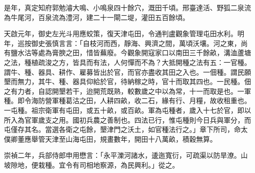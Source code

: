 是年，真定知府郭勉濬大鳴、小鳴泉四十餘穴，溉田千頃。邢臺達活、野狐二泉流為牛尾河，百泉流為澧河，建二十一閘二堤，灌田五百餘頃。

天啟元年，御史左光斗用應蛟策，復天津屯田，令通判盧觀象管理屯田水利。明年，巡按御史張慎言言：「自枝河而西，靜海、興濟之間，萬頃沃壤。河之東，尚有鹽水沽等處為膏腴之田，惜皆蕪廢。今觀象開寇家口以南田三千餘畝，溝洫蘆塘之法，種植疏浚之方，皆具而有法，人何憚而不為？大抵開種之法有五：一官種。謂牛、種、器具、耕作、雇募皆出於官，而官亦盡收其田之入也。一佃種。謂民願墾而無力，其牛、種、器具仰給於官，待納稼之時，官十而取其四也。一民種。佃之有力者，自認開墾若干，迨開荒既熟，較數歲之中以為常，十一而取是也。一軍種。即令海防營軍種葛沽之田，人耕四畝，收二石，緣有行、月糧，故收租重也。一屯種。祖宗衛軍有屯田，或五十畝，或百畝。軍為屯種者，歲入十七於官，即以所入為官軍歲支之用。國初兵農之善制也。四法已行，惟屯種則今日兵與軍分，而屯僅存其名。當選各衛之屯餘，墾津門之沃土，如官種法行之。」章下所司，命太僕卿董應舉管天津至山海屯田，規畫數年，開田十八萬畝，積穀無算。

崇禎二年，兵部侍郎申用懋言：「永平濼河諸水，逶迤寬衍，可疏渠以防旱潦。山坡隙地，便栽種。宜令有司相地察源，為民興利。」從之。

